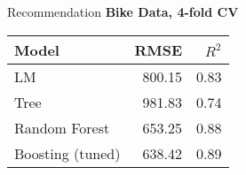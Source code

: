 \documentclass[11pt,compress,t,notes=noshow, aspectratio=169, xcolor=table]{beamer}
\begin{document}
\begin{frame}{Recommendation}
\centering \textbf{Bike Data, 4-fold CV}
\begin{table}[ht]
\centering
\begin{tabular}{lrr}
  \hline
Model & RMSE & $R^2$ \\ 
  \hline
  LM & 800.15 & 0.83 \\ 
  Tree & 981.83 & 0.74 \\ 
  Random Forest & 653.25 & 0.88 \\ 
  Boosting (tuned) & 638.42 & 0.89 \\ 
   \hline
\end{tabular}
\end{table}
\end{frame}



\endlecture
\end{document}
